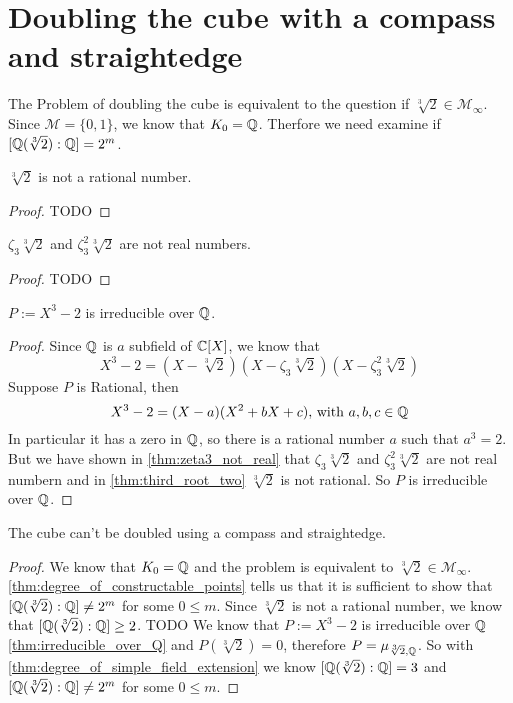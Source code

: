 \documentclass{../Project/TemplateExercise}
\begin{document}
\section{Doubling the cube with a compass and straightedge}
The Problem of doubling the cube is equivalent to the question if $\sqrt[3]{2} \in \mathcal{M}_{\infty}$.
Since $\mathcal{M} = \{0,1\}$, we know that $K_0 = \mathbb{Q}$. Therfore we need examine if $[\mathbb{Q}(\sqrt[3]{2}):\mathbb{Q}] = 2^m$.
\begin{lemma}
\label{thm:third_root_two}
    $\sqrt[3]{2}$ is not a rational number.
\end{lemma}

\begin{proof}
    TODO %
\end{proof}
\begin{lemma}
\label{thm:zeta3_not_real}
    $\zeta_3 \sqrt[3]{2}$ and $\zeta_3^2 \sqrt[3]{2}$ are not real numbers.
\end{lemma}
\begin{proof}
    TODO %
\end{proof}
\begin{theorem}
    $P := X^3 - 2$ is irreducible over $\mathbb{Q}$.
\label{thm:irreducible_over_Q}
\end{theorem}
\begin{proof}
    Since $\mathbb{Q}$ is $a$ subfield of $\mathbb{C} [X]$, we know that
    \begin{equation*}
        X^3 - 2 = (X - \sqrt[3]{2})(X -\zeta_3 \sqrt[3]{2})(X -\zeta_3^2 \sqrt[3]{2})
    \end{equation*}
    Suppose $P$ is Rational, then
    \begin{equation*}
        X^3 - 2 = (X - a)(X^2 + bX + c)\text{, with } a, b, c \in \mathbb{Q}
    \end{equation*}
    In particular it has a zero in $\mathbb{Q}$, so there is a rational number $a$ such that $a^3 = 2$.\newline
    But we have shown in \ref{thm:zeta3_not_real} that $\zeta_3 \sqrt[3]{2}$ and $\zeta_3^2 \sqrt[3]{2}$ are not real numbern and in \ref{thm:third_root_two} $\sqrt[3]{2}$ is not rational.
    So $P$ is irreducible over $\mathbb{Q}$.
\end{proof}
\begin{theorem}
    The cube can't be doubled using a compass and straightedge.
\end{theorem}
\begin{proof}
    We know that $K_0 = \mathbb{Q}$ and the problem is equivalent to $\sqrt[3]{2} \in \mathcal{M}_{\infty}$.\newline
    \ref{thm:degree_of_constructable_points} tells us that it is sufficient to show that $[\mathbb{Q}(\sqrt[3]{2}):\mathbb{Q}] \ne 2^m$ for some $0 \le m $.
    Since $\sqrt[3]{2}$ is not a rational number, we know that $[\mathbb{Q}(\sqrt[3]{2}):\mathbb{Q}] \ge 2$.
    TODO %
    \newline
    We know that $P := X^3 - 2$ is irreducible over $\mathbb{Q}$ \ref{thm:irreducible_over_Q} and $P(\sqrt[3]{2}) = 0$, therefore $P = \mu_{\sqrt[3]{2},\mathbb{Q}}$.
    So with \ref{thm:degree_of_simple_field_extension} we know $[\mathbb{Q}(\sqrt[3]{2}):\mathbb{Q}] = 3$ and $[\mathbb{Q}(\sqrt[3]{2}):\mathbb{Q}] \ne 2^m$ for some $0 \le m $.
\end{proof}
\end{document}
